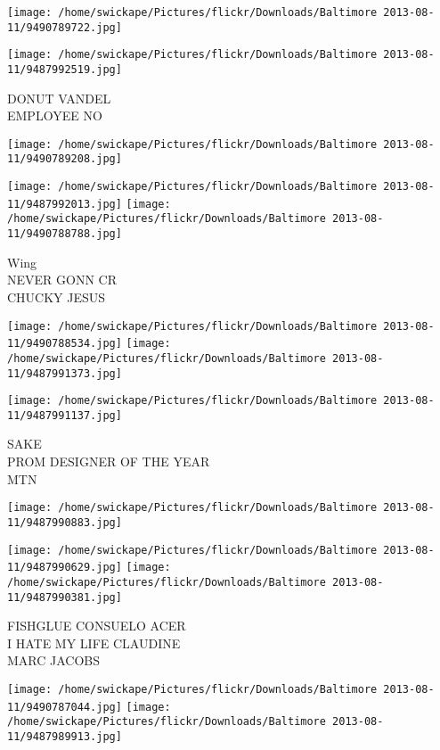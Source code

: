\documentclass[10pt,letterpaper]{article}
\begin{document}
\texttt{[image: /home/swickape/Pictures/flickr/Downloads/Baltimore 2013-08-11/9490789722.jpg]}

\vspace{0.25in}
\texttt{[image: /home/swickape/Pictures/flickr/Downloads/Baltimore 2013-08-11/9487992519.jpg]}

DONUT VANDEL\\
EMPLOYEE NO
\pagebreak

\texttt{[image: /home/swickape/Pictures/flickr/Downloads/Baltimore 2013-08-11/9490789208.jpg]}

\vspace{0.25in}
\texttt{[image: /home/swickape/Pictures/flickr/Downloads/Baltimore 2013-08-11/9487992013.jpg]}
\texttt{[image: /home/swickape/Pictures/flickr/Downloads/Baltimore 2013-08-11/9490788788.jpg]}

Wing\\
NEVER GONN CR\\
CHUCKY JESUS
\pagebreak

\texttt{[image: /home/swickape/Pictures/flickr/Downloads/Baltimore 2013-08-11/9490788534.jpg]}
\texttt{[image: /home/swickape/Pictures/flickr/Downloads/Baltimore 2013-08-11/9487991373.jpg]}

\texttt{[image: /home/swickape/Pictures/flickr/Downloads/Baltimore 2013-08-11/9487991137.jpg]}

SAKE\\
PROM DESIGNER OF THE YEAR\\
MTN
\pagebreak

\texttt{[image: /home/swickape/Pictures/flickr/Downloads/Baltimore 2013-08-11/9487990883.jpg]}

\vspace{0.25in}
\texttt{[image: /home/swickape/Pictures/flickr/Downloads/Baltimore 2013-08-11/9487990629.jpg]}
\texttt{[image: /home/swickape/Pictures/flickr/Downloads/Baltimore 2013-08-11/9487990381.jpg]}

FISHGLUE CONSUELO ACER\\
I HATE MY LIFE CLAUDINE\\
MARC JACOBS
\pagebreak

\texttt{[image: /home/swickape/Pictures/flickr/Downloads/Baltimore 2013-08-11/9490787044.jpg]}
\texttt{[image: /home/swickape/Pictures/flickr/Downloads/Baltimore 2013-08-11/9487989913.jpg]}
\end{document}
